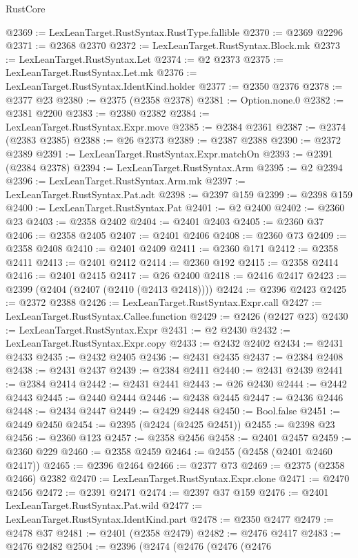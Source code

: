 \begin{lexlean}{RustCore}
\begin{coremodule}
@2369 := LexLeanTarget.RustSyntax.RustType.fallible
@2370 := @2369 @2296
@2371 := @2368 @2370
@2372 := LexLeanTarget.RustSyntax.Block.mk
@2373 := LexLeanTarget.RustSyntax.Let
@2374 := @2 @2373
@2375 := LexLeanTarget.RustSyntax.Let.mk
@2376 := LexLeanTarget.RustSyntax.IdentKind.holder
@2377 := @2350 @2376
@2378 := @2377 @23
@2380 := @2375 (@2358 @2378)
@2381 := Option.none.{0}
@2382 := @2381 @2200
@2383 := @2380 @2382
@2384 := LexLeanTarget.RustSyntax.Expr.move
@2385 := @2384 @2361
@2387 := @2374 (@2383 @2385)
@2388 := @26 @2373
@2389 := @2387 @2388
@2390 := @2372 @2389
@2391 := LexLeanTarget.RustSyntax.Expr.matchOn
@2393 := @2391 (@2384 @2378)
@2394 := LexLeanTarget.RustSyntax.Arm
@2395 := @2 @2394
@2396 := LexLeanTarget.RustSyntax.Arm.mk
@2397 := LexLeanTarget.RustSyntax.Pat.adt
@2398 := @2397 @159
@2399 := @2398 @159
@2400 := LexLeanTarget.RustSyntax.Pat
@2401 := @2 @2400
@2402 := @2360 @23
@2403 := @2358 @2402
@2404 := @2401 @2403
@2405 := @2360 @37
@2406 := @2358 @2405
@2407 := @2401 @2406
@2408 := @2360 @73
@2409 := @2358 @2408
@2410 := @2401 @2409
@2411 := @2360 @171
@2412 := @2358 @2411
@2413 := @2401 @2412
@2414 := @2360 @192
@2415 := @2358 @2414
@2416 := @2401 @2415
@2417 := @26 @2400
@2418 := @2416 @2417
@2423 := @2399 (@2404 (@2407 (@2410 (@2413 @2418))))
@2424 := @2396 @2423
@2425 := @2372 @2388
@2426 := LexLeanTarget.RustSyntax.Expr.call
@2427 := LexLeanTarget.RustSyntax.Callee.function
@2429 := @2426 (@2427 @23)
@2430 := LexLeanTarget.RustSyntax.Expr
@2431 := @2 @2430
@2432 := LexLeanTarget.RustSyntax.Expr.copy
@2433 := @2432 @2402
@2434 := @2431 @2433
@2435 := @2432 @2405
@2436 := @2431 @2435
@2437 := @2384 @2408
@2438 := @2431 @2437
@2439 := @2384 @2411
@2440 := @2431 @2439
@2441 := @2384 @2414
@2442 := @2431 @2441
@2443 := @26 @2430
@2444 := @2442 @2443
@2445 := @2440 @2444
@2446 := @2438 @2445
@2447 := @2436 @2446
@2448 := @2434 @2447
@2449 := @2429 @2448
@2450 := Bool.false
@2451 := @2449 @2450
@2454 := @2395 (@2424 (@2425 @2451))
@2455 := @2398 @23
@2456 := @2360 @123
@2457 := @2358 @2456
@2458 := @2401 @2457
@2459 := @2360 @229
@2460 := @2358 @2459
@2464 := @2455 (@2458 (@2401 @2460 @2417))
@2465 := @2396 @2464
@2466 := @2377 @73
@2469 := @2375 (@2358 @2466) @2382
@2470 := LexLeanTarget.RustSyntax.Expr.clone
@2471 := @2470 @2456
@2472 := @2391 @2471
@2474 := @2397 @37 @159
@2476 := @2401 LexLeanTarget.RustSyntax.Pat.wild
@2477 := LexLeanTarget.RustSyntax.IdentKind.part
@2478 := @2350 @2477
@2479 := @2478 @37
@2481 := @2401 (@2358 @2479)
@2482 := @2476 @2417
@2483 := @2476 @2482
@2504 := @2396
    (@2474
      (@2476
        (@2476
          (@2476

\end{coremodule}
\end{lexlean}
